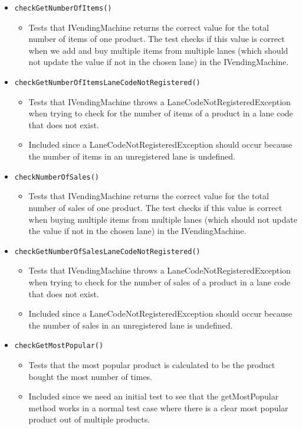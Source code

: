 \documentclass{article}
\begin{document}
\begin{itemize}
\item \verb+checkGetNumberOfItems()+
\begin{itemize}
\item Tests that IVendingMachine returns the correct value for the total number of items of one product. The test checks if this value is correct when we add and buy multiple items from multiple lanes (which should not update the value if not in the chosen lane) in the IVendingMachine. 
\end{itemize}

\item \verb+checkGetNumberOfItemsLaneCodeNotRegistered()+
\begin{itemize}
\item Tests that IVendingMachine throws a LaneCodeNotRegisteredException when trying to check for the number of items of a product in a lane code that does not exist.
\item Included since a LaneCodeNotRegisteredException should occur because the number of items in an unregistered lane is undefined.
\end{itemize}

\item \verb+checkNumberOfSales()+
\begin{itemize}
\item Tests that IVendingMachine returns the correct value for the total number of sales of one product. The test checks if this value is correct when buying multiple items from multiple lanes (which should not update the value if not in the chosen lane) in the IVendingMachine.
\end{itemize}

\item \verb+checkGetNumberOfSalesLaneCodeNotRegistered()+
\begin{itemize}
\item Tests that IVendingMachine throws a LaneCodeNotRegisteredException when trying to check for the number of sales of a product in a lane code that does not exist.
\item Included since a LaneCodeNotRegisteredException should occur because the number of sales in an unregistered lane is undefined.
\end{itemize}

\item \verb+checkGetMostPopular()+
\begin{itemize}
\item Tests that the most popular product is calculated to be the product bought the most number of times.
\item Included since we need an initial test to see that the getMostPopular method works in a normal test case where there is a clear most popular product out of multiple products.
\end{itemize}


\end{itemize}
\end{document}
